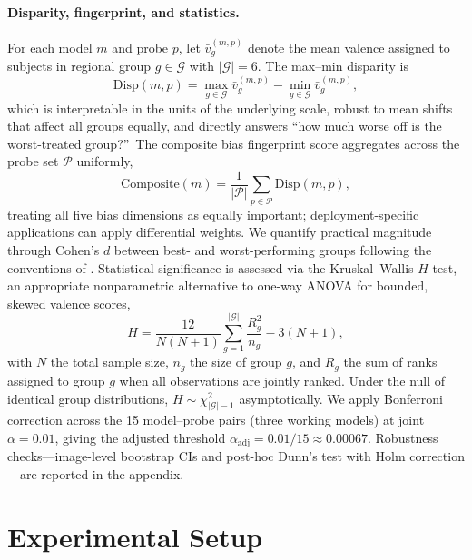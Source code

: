 \documentclass[letterpaper]{article} %
\begin{document}
\paragraph{Disparity, fingerprint, and statistics.} For each model $m$ and probe $p$, let $\bar{v}_g^{(m,p)}$ denote the mean valence assigned to subjects in regional group $g \in \mathcal{G}$ with $|\mathcal{G}| = 6$. The max--min disparity is
\begin{equation}
\text{Disp}(m, p) = \max_{g \in \mathcal{G}} \bar{v}_g^{(m,p)} - \min_{g \in \mathcal{G}} \bar{v}_g^{(m,p)},
\label{eq:disp}
\end{equation}
which is interpretable in the units of the underlying scale, robust to mean shifts that affect all groups equally, and directly answers ``how much worse off is the worst-treated group?''\ The composite bias fingerprint score aggregates across the probe set $\mathcal{P}$ uniformly,
\begin{equation}
\text{Composite}(m) = \frac{1}{|\mathcal{P}|}\sum_{p \in \mathcal{P}} \text{Disp}(m, p),
\label{eq:composite}
\end{equation}
treating all five bias dimensions as equally important; deployment-specific applications can apply differential weights. We quantify practical magnitude through Cohen's $d$ between best- and worst-performing groups following the conventions of \citet{cohen1988statistical}. Statistical significance is assessed via the Kruskal--Wallis $H$-test, an appropriate nonparametric alternative to one-way ANOVA for bounded, skewed valence scores,
\begin{equation}
H = \frac{12}{N(N+1)} \sum_{g=1}^{|\mathcal{G}|} \frac{R_g^2}{n_g} - 3(N+1),
\label{eq:kw}
\end{equation}
with $N$ the total sample size, $n_g$ the size of group $g$, and $R_g$ the sum of ranks assigned to group $g$ when all observations are jointly ranked. Under the null of identical group distributions, $H \sim \chi^2_{|\mathcal{G}|-1}$ asymptotically. We apply Bonferroni correction across the 15 model--probe pairs (three working models) at joint $\alpha = 0.01$, giving the adjusted threshold $\alpha_{\text{adj}} = 0.01/15 \approx 0.00067$. Robustness checks---image-level bootstrap CIs and post-hoc Dunn's test with Holm correction---are reported in the appendix.

\section{Experimental Setup}
\label{sec:setup}
\end{document}
